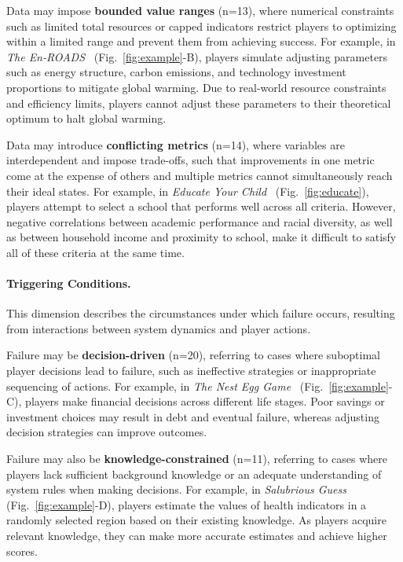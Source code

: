 Data may impose \textbf{bounded value ranges} (n=13), where numerical constraints such as limited total resources or capped indicators restrict players to optimizing within a limited range and prevent them from achieving success. For example, in \textit{The En-ROADS}~\cite{TheEn-ROADS} (Fig.~\ref{fig:example}-B), players simulate adjusting parameters such as energy structure, carbon emissions, and technology investment proportions to mitigate global warming. Due to real-world resource constraints and efficiency limits, players cannot adjust these parameters to their theoretical optimum to halt global warming.

Data may introduce \textbf{conflicting metrics} (n=14), where variables are interdependent and impose trade-offs, such that improvements in one metric come at the expense of others and multiple metrics cannot simultaneously reach their ideal states. For example, in \textit{Educate Your Child}~\cite{EducateYourChild} (Fig.~\ref{fig:educate}), players attempt to select a school that performs well across all criteria. However, negative correlations between academic performance and racial diversity, as well as between household income and proximity to school, make it difficult to satisfy all of these criteria at the same time.

\paragraph{Triggering Conditions.}
This dimension describes the circumstances under which failure occurs, resulting from interactions between system dynamics and player actions.

Failure may be \textbf{decision-driven} (n=20), referring to cases where suboptimal player decisions lead to failure, such as ineffective strategies or inappropriate sequencing of actions. For example, in \textit{The Nest Egg Game}~\cite{TheNestEggGame} (Fig.~\ref{fig:example}-C), players make financial decisions across different life stages. Poor savings or investment choices may result in debt and eventual failure, whereas adjusting decision strategies can improve outcomes.

Failure may also be \textbf{knowledge-constrained} (n=11), referring to cases where players lack sufficient background knowledge or an adequate understanding of system rules when making decisions. For example, in \textit{Salubrious Guess}~\cite{SalubriousGuess} (Fig.~\ref{fig:example}-D), players estimate the values of health indicators in a randomly selected region based on their existing knowledge. As players acquire relevant knowledge, they can make more accurate estimates and achieve higher scores.

